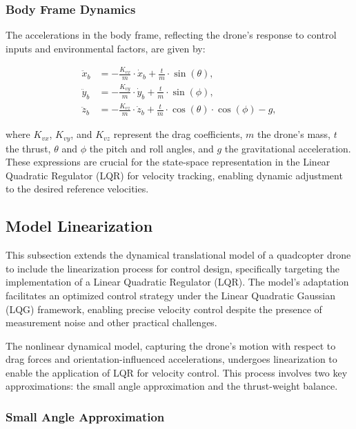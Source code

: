 \subsubsection{Body Frame Dynamics}

The accelerations in the body frame, reflecting the drone's response to control inputs and environmental factors, are given by:

\begin{align}
\ddot{x}_b &= -\frac{K_{vx}}{m} \cdot \dot{x}_b + \frac{t}{m} \cdot \sin(\theta), \\
\ddot{y}_b &= -\frac{K_{vy}}{m} \cdot \dot{y}_b + \frac{t}{m} \cdot \sin(\phi), \\
\ddot{z}_b &= -\frac{K_{vz}}{m} \cdot \dot{z}_b + \frac{t}{m} \cdot \cos(\theta) \cdot \cos(\phi) - g,
\end{align}

where \( K_{vx} \), \( K_{vy} \), and \( K_{vz} \) represent the drag coefficients, \( m \) the drone's mass, \( t \) the thrust, \( \theta \) and \( \phi \) the pitch and roll angles, and \( g \) the gravitational acceleration. These expressions are crucial for the state-space representation in the Linear Quadratic Regulator (LQR) for velocity tracking, enabling dynamic adjustment to the desired reference velocities.

\subsection{Model Linearization}
This subsection extends the dynamical translational model of a quadcopter drone to include the linearization process for control design, specifically targeting the implementation of a Linear Quadratic Regulator (LQR). The model's adaptation facilitates an optimized control strategy under the Linear Quadratic Gaussian (LQG) framework, enabling precise velocity control despite the presence of measurement noise and other practical challenges.

The nonlinear dynamical model, capturing the drone's motion with respect to drag forces and orientation-influenced accelerations, undergoes linearization to enable the application of LQR for velocity control. This process involves two key approximations: the small angle approximation and the thrust-weight balance.

\subsubsection{Small Angle Approximation}

